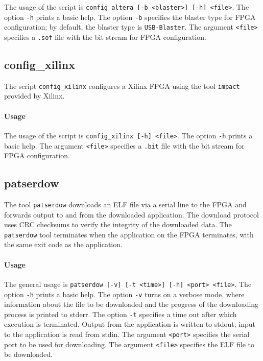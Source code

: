 \documentclass[a4paper,fontsize=10pt,twoside,DIV15,BCOR12mm,headinclude=true,footinclude=false,pagesize,bibtotoc]{scrbook}
\begin{document}
The usage of the script is \texttt{config\_altera [-b <blaster>] [-h]
  <file>}. The option \texttt{-h} prints a basic help. The option
\texttt{-b} specifies the blaster type for FPGA configuration; by
default, the blaster type is \texttt{USB-Blaster}. The argument
\texttt{<file>} specifies a \texttt{.sof} file with the bit stream for
FPGA configuration.

\subsection{config\_xilinx}

The script \texttt{config\_xilinx} configures a Xilinx FPGA using the
tool \texttt{impact} provided by Xilinx.

\paragraph{Usage}

The usage of the script is \texttt{config\_xilinx [-h] <file>}. The
option \texttt{-h} prints a basic help. The argument \texttt{<file>}
specifies a \texttt{.bit} file with the bit stream for FPGA
configuration.

\subsection{patserdow}

The tool \texttt{patserdow} downloads an ELF file via a serial line to
the FPGA and forwards output to and from the downloaded
application. The download protocol uses CRC checksums to verify the
integrity of the downloaded data. The \texttt{patserdow} tool
terminates when the application on the FPGA terminates, with the same
exit code as the application.

\paragraph{Usage}

The general usage is \texttt{patserdow [-v] [-t <time>] [-h] <port> <file>}. The
option \texttt{-h} prints a basic help. The option \texttt{-v} turns
on a verbose mode, where information about the file to be downloaded
and the progress of the downloading process is printed to
stderr. The option \texttt{-t} specifies a time out after which execution is terminated.
Output from the application is written to stdout; input to the
application is read from stdin. The argument \texttt{<port>} specifies
the serial port to be used for downloading. The argument
\texttt{<file>} specifies the ELF file to be downloaded.
\end{document}
